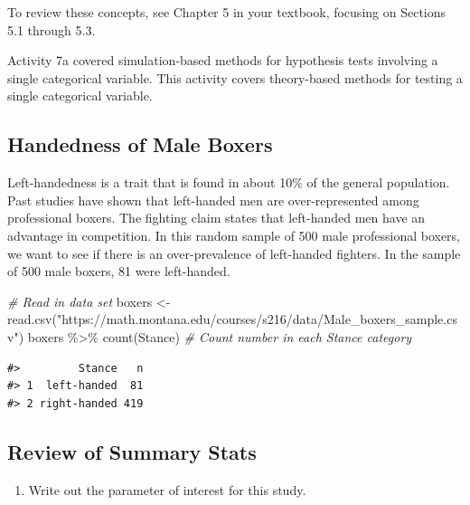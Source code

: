 \documentclass[
]{report}
\newenvironment{Shaded}{\begin{snugshade}}{\end{snugshade}}
\newcommand{\CommentTok}[1]{\textcolor[rgb]{0.56,0.35,0.01}{\textit{#1}}}
\newcommand{\FunctionTok}[1]{\textcolor[rgb]{0.00,0.00,0.00}{#1}}
\newcommand{\NormalTok}[1]{#1}
\newcommand{\OtherTok}[1]{\textcolor[rgb]{0.56,0.35,0.01}{#1}}
\newcommand{\SpecialCharTok}[1]{\textcolor[rgb]{0.00,0.00,0.00}{#1}}
\newcommand{\StringTok}[1]{\textcolor[rgb]{0.31,0.60,0.02}{#1}}
\providecommand{\tightlist}{%
  \setlength{\itemsep}{0pt}\setlength{\parskip}{0pt}}
\begin{document}
To review these concepts, see Chapter 5 in your textbook, focusing on Sections 5.1 through 5.3.

Activity 7a covered simulation-based methods for hypothesis tests involving a single categorical variable. This activity covers theory-based methods for testing a single categorical variable.

\hypertarget{handedness-of-male-boxers}{%
\subsection{Handedness of Male Boxers}\label{handedness-of-male-boxers}}

Left-handedness is a trait that is found in about 10\% of the general population. Past studies have shown that left-handed men are over-represented among professional boxers. The fighting claim states that left-handed men have an advantage in competition. In this random sample of 500 male professional boxers, we want to see if there is an over-prevalence of left-handed fighters. In the sample of 500 male boxers, 81 were left-handed.

\begin{Shaded}
\begin{Highlighting}[]
 \CommentTok{\# Read in data set}
\NormalTok{boxers }\OtherTok{\textless{}{-}} \FunctionTok{read.csv}\NormalTok{(}\StringTok{"https://math.montana.edu/courses/s216/data/Male\_boxers\_sample.csv"}\NormalTok{)}
\NormalTok{boxers }\SpecialCharTok{\%\textgreater{}\%} \FunctionTok{count}\NormalTok{(Stance)  }\CommentTok{\# Count number in each Stance category}
\end{Highlighting}
\end{Shaded}

\begin{verbatim}
#>         Stance   n
#> 1  left-handed  81
#> 2 right-handed 419
\end{verbatim}

\hypertarget{review-of-summary-stats}{%
\subsection*{Review of Summary Stats}\label{review-of-summary-stats}}

\begin{enumerate}
\def\labelenumi{\arabic{enumi}.}
\tightlist
\item
  Write out the parameter of interest for this study.
\end{enumerate}
\end{document}
